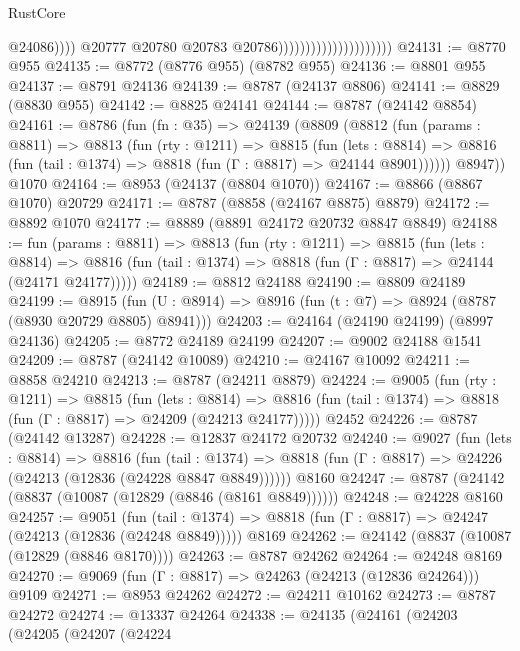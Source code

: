 \begin{lexlean}{RustCore}
\begin{coremodule}
                                                      @24086))))
                                              @20777
                                              @20780
                                              @20783
                                              @20786)))))))))))))))))))))
@24131 := @8770 @955
@24135 := @8772 (@8776 @955) (@8782 @955)
@24136 := @8801 @955
@24137 := @8791 @24136
@24139 := @8787 (@24137 @8806)
@24141 := @8829 (@8830 @955)
@24142 := @8825 @24141
@24144 := @8787 (@24142 @8854)
@24161 := @8786
    (fun (fn : @35) =>
    @24139
      (@8809
        (@8812
          (fun (params : @8811) =>
          @8813
            (fun (rty : @1211) =>
            @8815
              (fun (lets : @8814) =>
              @8816 (fun (tail : @1374) => @8818 (fun (Γ : @8817) => @24144 @8901))))))
        @8947))
    @1070
@24164 := @8953 (@24137 (@8804 @1070))
@24167 := @8866 (@8867 @1070) @20729
@24171 := @8787 (@8858 (@24167 @8875) @8879)
@24172 := @8892 @1070
@24177 := @8889 (@8891 @24172 @20732 @8847 @8849)
@24188 := fun (params : @8811) =>
  @8813
    (fun (rty : @1211) =>
    @8815
      (fun (lets : @8814) =>
      @8816 (fun (tail : @1374) => @8818 (fun (Γ : @8817) => @24144 (@24171 @24177)))))
@24189 := @8812 @24188
@24190 := @8809 @24189
@24199 := @8915
    (fun (U : @8914) => @8916 (fun (t : @7) => @8924 (@8787 (@8930 @20729 @8805) @8941)))
@24203 := @24164 (@24190 @24199) (@8997 @24136)
@24205 := @8772 @24189 @24199
@24207 := @9002 @24188 @1541
@24209 := @8787 (@24142 @10089)
@24210 := @24167 @10092
@24211 := @8858 @24210
@24213 := @8787 (@24211 @8879)
@24224 := @9005
    (fun (rty : @1211) =>
    @8815
      (fun (lets : @8814) =>
      @8816 (fun (tail : @1374) => @8818 (fun (Γ : @8817) => @24209 (@24213 @24177)))))
    @2452
@24226 := @8787 (@24142 @13287)
@24228 := @12837 @24172 @20732
@24240 := @9027
    (fun (lets : @8814) =>
    @8816
      (fun (tail : @1374) =>
      @8818 (fun (Γ : @8817) => @24226 (@24213 (@12836 (@24228 @8847 @8849))))))
    @8160
@24247 := @8787 (@24142 (@8837 (@10087 (@12829 (@8846 (@8161 @8849))))))
@24248 := @24228 @8160
@24257 := @9051
    (fun (tail : @1374) => @8818 (fun (Γ : @8817) => @24247 (@24213 (@12836 (@24248 @8849)))))
    @8169
@24262 := @24142 (@8837 (@10087 (@12829 (@8846 @8170))))
@24263 := @8787 @24262
@24264 := @24248 @8169
@24270 := @9069 (fun (Γ : @8817) => @24263 (@24213 (@12836 @24264))) @9109
@24271 := @8953 @24262
@24272 := @24211 @10162
@24273 := @8787 @24272
@24274 := @13337 @24264
@24338 := @24135
    (@24161
      (@24203
        (@24205
          (@24207
            (@24224

\end{coremodule}
\end{lexlean}
